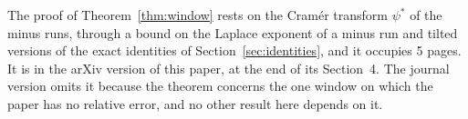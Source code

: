 \else
The proof of Theorem~\ref{thm:window} rests on the Cram\'er transform $\psi^*$ of the minus
runs, through a bound on the Laplace exponent of a minus run and tilted versions of the
exact identities of Section~\ref{sec:identities}, and it occupies 5 pages. It is in the arXiv
version of this paper, at the end of its Section~4. The journal version omits it because the
theorem concerns the one window on which the paper has no relative error, and no other
result here depends on it.
\fi
